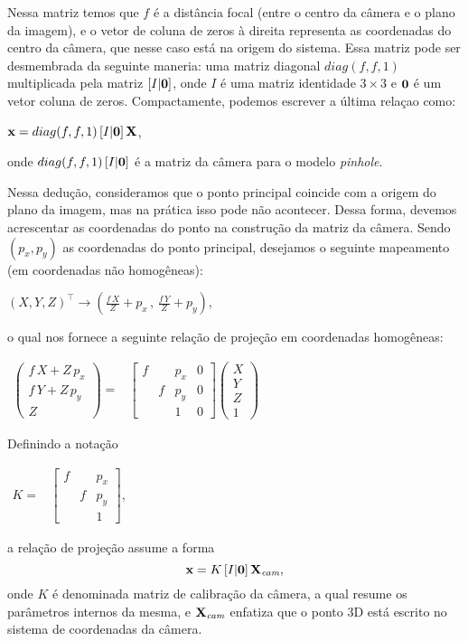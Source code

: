 Nessa matriz temos que $f$ é a distância focal (entre o centro da câmera e o plano da imagem), e o vetor de coluna de zeros à direita representa as coordenadas do centro da câmera, que nesse caso está na origem do sistema. Essa matriz pode ser desmembrada da seguinte maneria: uma matriz diagonal $diag(f,f,1)$ multiplicada pela matriz $[I|{\bf 0}]$, onde $I$ é uma matriz identidade $3\times3$ e ${\bf 0}$ é um vetor coluna de zeros. Compactamente, podemos escrever a última relaçao como:
\begin{center}
$\mathbf{x} = diag(f,f,1)\,[I|{\bf 0}]\,\mathbf{X}$,
\end{center}
onde $diag(f,f,1)\,[I|{\bf 0}]$ é a matriz da câmera para o modelo \textit{pinhole}.

Nessa dedução, consideramos que o ponto principal  coincide com a origem do plano da imagem, mas na prática isso pode não acontecer. Dessa forma, devemos acrescentar as coordenadas do ponto na construção da matriz da câmera. Sendo $(p_x,p_y)$ as coordenadas do ponto principal, desejamos o seguinte mapeamento (em coordenadas não homogêneas):
\begin{center}
$(X,Y,Z)^\top \rightarrow (\frac{f\,X}{Z}+p_x\,,\,\frac{f\,Y}{Z}+p_y)$,
\end{center}
o qual nos fornece a seguinte relação de projeção em coordenadas homogêneas:
\begin{center}
$
\begin{array}{ccc}
\begin{pmatrix}
f\,X + Z\,p_x\\
f\,Y + Z\,p_y\\
Z
\end{pmatrix}=
&
\begin{bmatrix}
f& &p_x&0\\
 &f&p_y&0\\
 & &1&0
\end{bmatrix}
\begin{pmatrix}
X\\
Y\\
Z\\
1
\end{pmatrix}
\end{array}
$
\end{center}
Definindo a notação
\begin{center}
$
\begin{array}{cc}
K = & \begin{bmatrix}
      f& &p_x\\
       &f&p_y\\
       & &1
      \end{bmatrix}, 
\end{array}
$
\end{center}
a relação de projeção assume a forma
\begin{equation}\label{eq.camera-incompleta}
\mathbf{x}=K\,[I|{\bf 0}]\,\mathbf{X}_{\textit{cam}},
\end{equation}
onde $K$ é denominada matriz de calibração da câmera, a qual resume os parâmetros internos da mesma, e $\mathbf{X}_{\textit{cam}}$ enfatiza que o ponto 3D está escrito no sistema de coordenadas da câmera.

